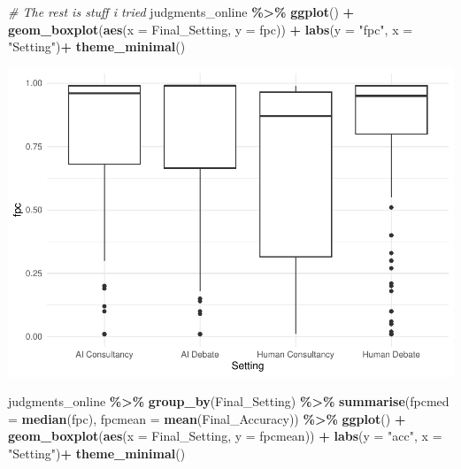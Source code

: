 \documentclass[
]{article}
\newenvironment{Shaded}{\begin{snugshade}}{\end{snugshade}}
\newcommand{\AttributeTok}[1]{\textcolor[rgb]{0.13,0.29,0.53}{#1}}
\newcommand{\CommentTok}[1]{\textcolor[rgb]{0.56,0.35,0.01}{\textit{#1}}}
\newcommand{\FunctionTok}[1]{\textcolor[rgb]{0.13,0.29,0.53}{\textbf{#1}}}
\newcommand{\NormalTok}[1]{#1}
\newcommand{\SpecialCharTok}[1]{\textcolor[rgb]{0.81,0.36,0.00}{\textbf{#1}}}
\newcommand{\StringTok}[1]{\textcolor[rgb]{0.31,0.60,0.02}{#1}}
\begin{document}
\begin{Shaded}
\begin{Highlighting}[]
\CommentTok{\# The rest is stuff i tried}
\NormalTok{judgments\_online }\SpecialCharTok{\%\textgreater{}\%}
  \FunctionTok{ggplot}\NormalTok{() }\SpecialCharTok{+}
  \FunctionTok{geom\_boxplot}\NormalTok{(}\FunctionTok{aes}\NormalTok{(}\AttributeTok{x =}\NormalTok{ Final\_Setting, }\AttributeTok{y =}\NormalTok{ fpc)) }\SpecialCharTok{+}
  \FunctionTok{labs}\NormalTok{(}\AttributeTok{y =} \StringTok{"fpc"}\NormalTok{, }\AttributeTok{x =} \StringTok{"Setting"}\NormalTok{)}\SpecialCharTok{+}
  \FunctionTok{theme\_minimal}\NormalTok{()}
\end{Highlighting}
\end{Shaded}

\includegraphics{debate-2309_files/figure-latex/final probability correct-1.pdf}

\begin{Shaded}
\begin{Highlighting}[]
\NormalTok{judgments\_online }\SpecialCharTok{\%\textgreater{}\%}
  \FunctionTok{group\_by}\NormalTok{(Final\_Setting) }\SpecialCharTok{\%\textgreater{}\%} \FunctionTok{summarise}\NormalTok{(}\AttributeTok{fpcmed =} \FunctionTok{median}\NormalTok{(fpc),}
                                                           \AttributeTok{fpcmean =} \FunctionTok{mean}\NormalTok{(Final\_Accuracy)) }\SpecialCharTok{\%\textgreater{}\%}
  \FunctionTok{ggplot}\NormalTok{() }\SpecialCharTok{+}
  \FunctionTok{geom\_boxplot}\NormalTok{(}\FunctionTok{aes}\NormalTok{(}\AttributeTok{x =}\NormalTok{ Final\_Setting, }\AttributeTok{y =}\NormalTok{ fpcmean)) }\SpecialCharTok{+}
  \FunctionTok{labs}\NormalTok{(}\AttributeTok{y =} \StringTok{"acc"}\NormalTok{, }\AttributeTok{x =} \StringTok{"Setting"}\NormalTok{)}\SpecialCharTok{+}
  \FunctionTok{theme\_minimal}\NormalTok{()}
\end{Highlighting}
\end{Shaded}
\end{document}
